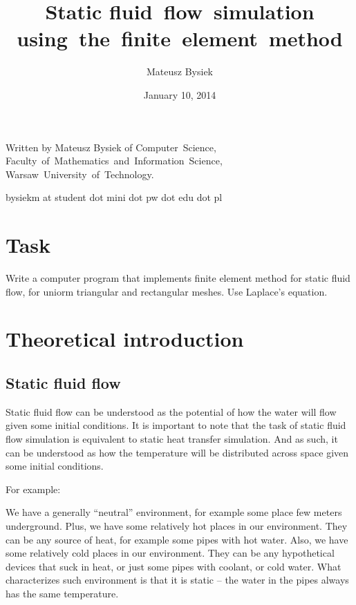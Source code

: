 \documentclass[a4paper,12pt]{article}
\begin{document}
\title{Static fluid~flow~simulation using~the~finite~element~method}
\date{January 10, 2014}
\author{Mateusz Bysiek}
\maketitle

\begin{footnotesize}

Written by Mateusz Bysiek of Computer~Science, Faculty~of~Mathematics~and~Information~Science,
Warsaw~University~of~Technology.

bysiekm at student dot mini dot pw dot edu dot pl

\end{footnotesize}

\section{Task}

Write a computer program that implements finite element method for static fluid flow, for uniorm triangular and
rectangular meshes. Use Laplace's equation.

\section{Theoretical introduction}

\subsection{Static fluid flow}

Static fluid flow can be understood as the potential of how the water will flow given some initial conditions. It is
important to note that the task of static fluid flow simulation is equivalent to static heat transfer simulation. And as
such, it can be understood as how the temperature will be distributed across space given some initial conditions.
\cite{wiki_heat_transfer}

For example:


We have a generally ``neutral'' environment, for example some place few meters underground. Plus, we have some
relatively hot places in our environment. They can be any source of heat, for example some pipes with hot water. Also,
we have some relatively cold places in our environment. They can be any hypothetical devices that suck in heat, or just
some pipes with coolant, or cold water. What characterizes such environment is that it is static -- the water in the
pipes always has the same temperature.
\end{document}
